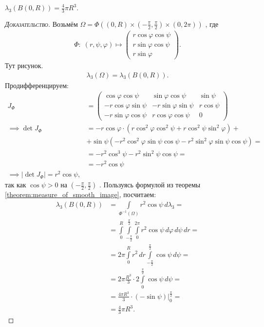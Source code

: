 \begin{exmpl}
 $\lambda_3(B(0, R)) = \frac{4}{3}\pi R^{3}$.
\end{exmpl}
\begin{proof}[\normalfont\textsc{Доказательство}]
 Возьмём $\Omega = \Phi((0, R) \times (-\frac{\pi}{2}, \frac{\pi}{2}) \times (0, 2\pi))$ , где \begin{align*}
  \Phi \colon\; (r, \psi, \varphi) \mapsto \begin{pmatrix}
   r \cos \varphi \cos \psi \\
   r \sin \varphi \cos \psi \\
   r \sin \varphi
  \end{pmatrix}
 .\end{align*} { \color{red} Тут рисунок}.
 \begin{align*}
  \lambda_3(\Omega) = \lambda_3(B(0, R))
 .\end{align*} Продифференцируем: \begin{align*}
 J_{\Phi} &= \begin{pmatrix}
   \cos \varphi \cos \psi & \sin \varphi \cos \psi & \sin \psi \\
   -r \cos \varphi \sin \psi & -r \sin \varphi \sin \psi & r \cos \psi \\
   -r \sin \varphi \cos \psi & r \cos \varphi \cos \psi & 0
  \end{pmatrix} \\
  \implies \det J_{\Phi} &= -r\cos \varphi \cdot (r \cos^{2}\varphi \cos^{2}\psi + r \cos^{2}\psi \sin^{2}\varphi) + \\
  &+ \sin \psi (-r^{2}\cos^{2} \varphi \sin \psi \cos \psi - r^{2}\sin^{2}\varphi \sin \psi \cos \psi) = \\
  &= -r^{2} \cos^{3} \psi - r^{2} \sin^{2} \psi \cos \psi = \\
  &= -r^{2} \cos \psi \\
  \implies \left| \det J_{\Phi} \right| = r^{2} \cos \psi
  ,\end{align*}  так как $\cos \psi > 0$  на $(-\frac{\pi}{2}, \frac{\pi}{2})$ . Пользуясь формулой из теоремы \ref{theorem:measure_of_smooth_image}, посчитаем: \begin{align*}
 \lambda_3(B(0, R)) &= \int\limits_{\Phi^{-1}(\Omega)} r^{2}\cos \psi \, d\lambda_3 = \\
 &= \int\limits_{0}^{R} \int\limits_{-\frac{\pi}{2}}^{\frac{\pi}{2}}  \int\limits_{0}^{2\pi} r^{2}\cos \psi \, d\varphi  \, d\psi  \, dr = \\
 &= 2\pi \int\limits_{0}^{R} r^{2} \, dr \int\limits_{-\frac{\pi}{2}}^{\frac{\pi}{2}} \cos \psi \, d\psi = \\
 &= 2\pi \frac{R^{3}}{3} \cdot 2 \int\limits_{0}^{\frac{\pi}{2}}  \cos\psi \, d\psi = \\
 &= \frac{4\pi R^{3}}{3} \cdot \left( -\sin \psi \right) \bigg\rvert_0^{\frac{\pi}{2}} = \\
 &= \frac{4}{3}\pi R^{3}
 .\end{align*} 
\end{proof}
